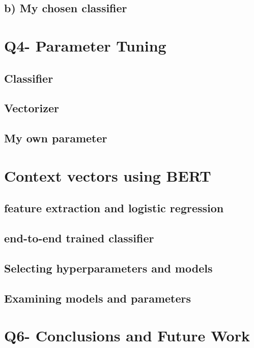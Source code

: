 \documentclass[a4paper,11pt]{article}
\begin{document}
\subsection{b) My chosen classifier}

\section{Q4- Parameter Tuning}
\subsection{Classifier}
\subsection{Vectorizer}
\subsection{My own parameter}


\section{Context vectors using BERT}
\subsection{feature extraction and logistic regression}
\subsection{end-to-end trained classifier}
\subsection{Selecting hyperparameters and models}
\subsection{Examining models and parameters}


\section{Q6- Conclusions and Future Work}
\end{document}
